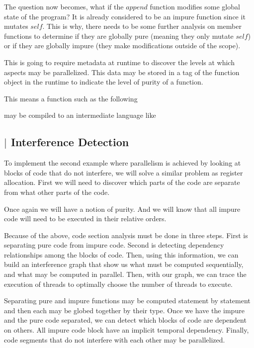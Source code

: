 \documentclass{article}
\begin{document}
\begin{multicols}{2}
The question now becomes, what if the $append$ function modifies some global state of the
program? It is already considered to be an impure function since it mutates $self$. This
is why, there needs to be some further analysis on member functions to determine if they are
globally pure (meaning they only mutate $self$) or if they are globally impure (they make
modifications outside of the scope).

This is going to require metadata at runtime to discover the levels at which aspects may
be parallelized. This data may be stored in a tag of the function object in the runtime to
indicate the level of purity of a function.

This means a function such as the following


may be compiled to an intermediate language like


\subsection*{$\vert$ Interference Detection}

To implement the second example where parallelism is achieved by looking at blocks of code
that do not interfere, we will solve a similar problem as register allocation. First
we will need to discover which parts of the code are separate from what other parts of the code.

Once again we will have a notion of purity. And we will know that all impure code will need
to be executed in their relative orders.

Because of the above, code section analysis must be done in three steps. First is separating pure
code from impure code. Second is detecting dependency relationships among the blocks of code.
Then, using this information, we can build an interference graph that show us what must be computed
sequentially, and what may be computed in parallel. Then, with our graph, we can trace the
execution of threads to optimally choose the number of threads to execute.

Separating pure and impure functions may be computed statement by statement and then each may be
globed together by their type. Once we have the impure and the pure code separated, we can detect
which blocks of code are dependent on others. All impure code block have an implicit temporal
dependency. Finally, code segments that do not interfere with each other may be parallelized.


\end{multicols}
\end{document}
